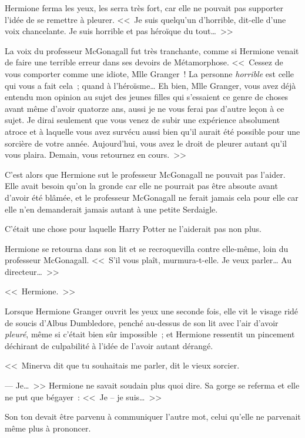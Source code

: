 Hermione ferma les yeux, les serra très fort, car elle ne pouvait pas supporter l'idée de se remettre à pleurer. <<~Je suis quelqu'un d'horrible, dit-elle d'une voix chancelante. Je suis horrible et pas héroïque du tout…~>>

La voix du professeur McGonagall fut très tranchante, comme si Hermione venait de faire une terrible erreur dans ses devoirs de Métamorphose. <<~Cessez de vous comporter comme une idiote, Mlle Granger~! La personne \emph{horrible} est celle qui vous a fait cela~; quand à l'héroïsme… Eh bien, Mlle Granger, vous avez déjà entendu mon opinion au sujet des jeunes filles qui s'essaient ce genre de choses avant même d'avoir quatorze ans, aussi je ne vous ferai pas d'autre leçon à ce sujet. Je dirai seulement que vous venez de subir une expérience absolument atroce et à laquelle vous avez survécu aussi bien qu'il aurait été possible pour une sorcière de votre année. Aujourd'hui, vous avez le droit de pleurer autant qu'il vous plaira. Demain, vous retournez en cours.~>>

C'est alors que Hermione sut le professeur McGonagall ne pouvait pas l'aider. Elle avait besoin qu'on la gronde car elle ne pourrait pas être absoute avant d'avoir été blâmée, et le professeur McGonagall ne ferait jamais cela pour elle car elle n'en demanderait jamais autant à une petite Serdaigle.

C'était une chose pour laquelle Harry Potter ne l'aiderait pas non plus.

Hermione se retourna dans son lit et se recroquevilla contre elle-même, loin du professeur McGonagall. <<~S'il vous plaît, murmura-t-elle. Je veux parler… Au directeur…~>>

\later

<<~Hermione.~>>

Lorsque Hermione Granger ouvrit les yeux une seconde fois, elle vit le visage ridé de soucis d'Albus Dumbledore, penché au-dessus de son lit avec l'air d'avoir \emph{pleuré}, même si c'était bien sûr impossible~; et Hermione ressentit un pincement déchirant de culpabilité à l'idée de l'avoir autant dérangé.

<<~Minerva dit que tu souhaitais me parler, dit le vieux sorcier.

--- Je…~>> Hermione ne savait soudain plus quoi dire. Sa gorge se referma et elle ne put que bégayer~: <<~Je -- je suis…~>>

Son ton devait être parvenu à communiquer l'autre mot, celui qu'elle ne parvenait même plus à prononcer.


